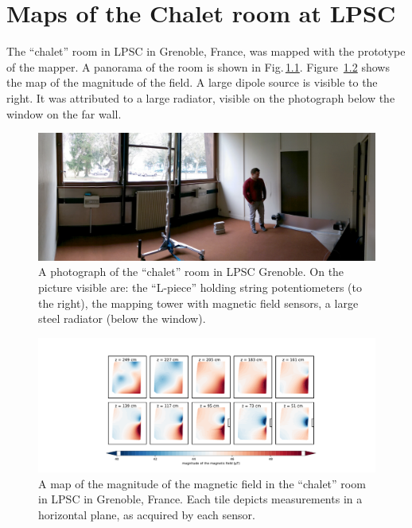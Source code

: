 \chapter{Maps of the Chalet room at LPSC}
\label{ch:chalet_appendix}
The ``chalet'' room in LPSC in Grenoble, France, was mapped with the prototype of the mapper. A panorama of the room is shown in Fig.\,\ref{fig:mapping_lpsc_chalet}. Figure~\ref{fig:mapping_lpsc_chalet_magnitude_map} shows the map of the magnitude of the field. A large dipole source is visible to the right. It was attributed to a large radiator, visible on the photograph below the window on the far wall.

\begin{figure}
  \centering
  \includegraphics[width=\linewidth]{gfx/mapping/lpsc/chalet_panorama.jpg}
  \caption{A photograph of the ``chalet'' room in LPSC Grenoble. On the picture visible are: the ``L-piece'' holding string potentiometers (to the right), the mapping tower with magnetic field sensors, a large steel radiator (below the window).}\label{fig:mapping_lpsc_chalet}
\end{figure}

\begin{figure}
  \centering
  \includegraphics[width=\linewidth]{gfx/mapping/lpsc/chalet.pdf}
  \caption{A map of the magnitude of the magnetic field in the ``chalet'' room in LPSC in Grenoble, France. Each tile depicts measurements in a horizontal plane, as acquired by each sensor.}\label{fig:mapping_lpsc_chalet_magnitude_map}
\end{figure}
